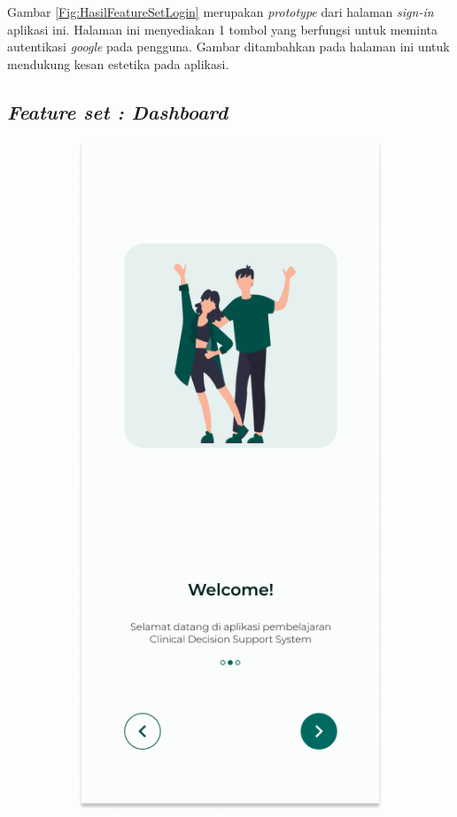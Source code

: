Gambar \ref*{Fig:HasilFeatureSetLogin} merupakan \textit{prototype} dari halaman \textit{sign-in} aplikasi ini. 
Halaman ini menyediakan 1 tombol yang berfungsi untuk meminta autentikasi \textit{google} pada pengguna.
Gambar ditambahkan pada halaman ini untuk mendukung kesan estetika pada aplikasi.
\subsection{\textit{Feature set : Dashboard}}
\begin{figure}[H]
	\centering
	\begin{subfigure}[b]{0.23\textwidth}
		\centering
	  \includegraphics[width=\linewidth]{contents/chapter-3/images/HF-Boarding-1.png}

\end{subfigure}
\end{figure}
